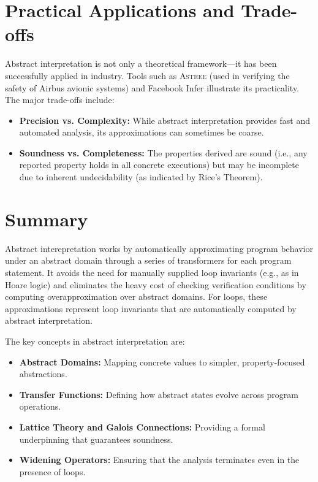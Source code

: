 \documentclass[oneside,11pt,dvipsnames]{book}
\begin{document}
\section{Practical Applications and Trade-offs}

Abstract interpretation is not only a theoretical framework—it has been successfully applied in industry. Tools such as \textsc{Astree} (used in verifying the safety of Airbus avionic systems) and Facebook Infer illustrate its practicality. The major trade-offs include:
\begin{itemize}
    \item \textbf{Precision vs. Complexity:} While abstract interpretation provides fast and automated analysis, its approximations can sometimes be coarse.
    \item \textbf{Soundness vs. Completeness:} The properties derived are sound (i.e., any reported property holds in all concrete executions) but may be incomplete due to inherent undecidability (as indicated by Rice's Theorem).
\end{itemize}

\section{Summary}

Abstract interepretation works by automatically approximating program behavior under an abstract domain through a series of transformers for each program statement. It avoids the need for manually supplied loop invariants (e.g., as in Hoare logic) and eliminates the heavy cost of checking verification conditions by computing overapproximation over abstract domains.  For loops, these approximations represent loop invariants that are automatically computed by abstract interpretation.  

The key concepts in abstract interpretation are:

\begin{itemize}
    \item \textbf{Abstract Domains:} Mapping concrete values to simpler, property-focused abstractions.
    \item \textbf{Transfer Functions:} Defining how abstract states evolve across program operations.
    \item \textbf{Lattice Theory and Galois Connections:} Providing a formal underpinning that guarantees soundness.
    \item \textbf{Widening Operators:} Ensuring that the analysis terminates even in the presence of loops.
\end{itemize}
\end{document}
